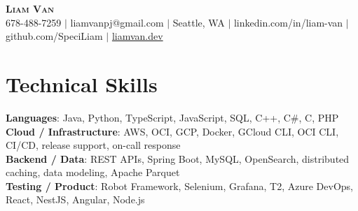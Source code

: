 \documentclass[letterpaper,11pt]{article}
\begin{document}

%
\begin{center}
    \textbf{\Huge \scshape Liam Van} \\ \vspace{1pt}
    \small 678-488-7259 $|$ liamvanpj@gmail.com $|$ Seattle, WA $|$
    linkedin.com/in/liam-van $|$ github.com/SpeciLiam $|$ \href{https://liamvan.dev}{liamvan.dev}

\end{center}

\section{Technical Skills}
 \begin{itemize}[leftmargin=0.15in, label={}]
    \small{\item{
     \textbf{Languages}{: Java, Python, TypeScript, JavaScript, SQL, C++, C\#, C, PHP} \\
     \textbf{Cloud / Infrastructure}{: AWS, OCI, GCP, Docker, GCloud CLI, OCI CLI, CI/CD, release support, on-call response} \\
     \textbf{Backend / Data}{: REST APIs, Spring Boot, MySQL, OpenSearch, distributed caching, data modeling, Apache Parquet} \\
     \textbf{Testing / Product}{: Robot Framework, Selenium, Grafana, T2, Azure DevOps, React, NestJS, Angular, Node.js} \\
    }}
 \end{itemize}
%

\end{document}
